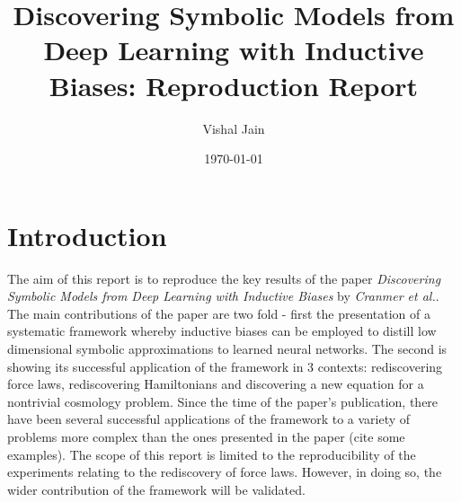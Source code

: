 \documentclass[11pt]{article}
\title{Discovering Symbolic Models from Deep Learning
with Inductive Biases: Reproduction Report}
\author{Vishal Jain}
\date{\today}
\begin{document}
\tableofcontents
\section{Introduction}






The aim of this report is to reproduce the key results of the paper \textit{Discovering Symbolic Models from Deep Learning with Inductive Biases} by \textit{Cranmer et al.}. The main contributions of the paper are two fold - first the presentation of a systematic framework whereby inductive biases can be employed to distill low dimensional symbolic approximations to learned neural networks. The second is showing its successful application of the framework in 3 contexts: rediscovering force laws, rediscovering Hamiltonians and discovering a new equation for a nontrivial cosmology problem. Since the time of the paper's publication, there have been several successful applications of the framework to a variety of problems more complex than the ones presented in the paper (cite some examples).
The scope of this report is limited to the reproducibility of the experiments relating to the rediscovery of force laws. However, in doing so, the wider contribution of the framework will be validated.
\end{document}
